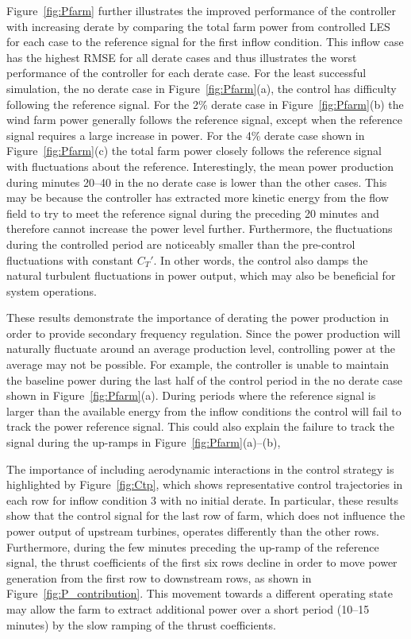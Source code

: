 Figure~\ref{fig:Pfarm} further illustrates the improved performance of the controller with increasing derate by comparing the total farm power from controlled LES for each case to the reference signal for the first inflow condition. This inflow case has the highest RMSE for all derate cases and thus illustrates the worst performance of the controller for each derate case. For the least successful simulation, the no derate case in Figure~\ref{fig:Pfarm}(a), the control has difficulty following the reference signal. For the 2\% derate case in Figure~\ref{fig:Pfarm}(b) the wind farm power generally follows the reference signal, except when the reference signal requires a large increase in power. For the 4\% derate case shown in Figure~\ref{fig:Pfarm}(c) the total farm power closely follows the reference signal with fluctuations about the reference. Interestingly, the mean power production during minutes 20--40 in the no derate case is lower than the other cases. This may be because the controller has extracted more kinetic energy from the flow field to try to meet the reference signal during the preceding 20 minutes and therefore cannot increase the power level further. Furthermore, the fluctuations during the controlled period are noticeably smaller than the pre-control fluctuations with constant $C_T'$. In other words, the control also damps the natural turbulent fluctuations in power output, which may also be beneficial for system operations.


These results demonstrate the importance of derating the power production in order to provide secondary frequency regulation. Since the power production will naturally fluctuate around an average production level, controlling power at the average may not be possible. For example, the controller is unable to maintain the baseline power during the last half of the control period in the no derate case shown in Figure~\ref{fig:Pfarm}(a). During periods where the reference signal is larger than the available energy from the inflow conditions the control will fail to track the power reference signal. This could also explain the failure to track the signal during the up-ramps in Figure~\ref{fig:Pfarm}(a)--(b), 

The importance of including aerodynamic interactions in the control strategy is highlighted by Figure~\ref{fig:Ctp}, which shows representative control trajectories in each row for inflow condition 3 with no initial derate. In particular, these results show that the control signal for the last row of farm, which does not influence the power output of upstream turbines, operates differently than the other rows. Furthermore, during the few minutes preceding the up-ramp of the reference signal, the thrust coefficients of the first six rows decline in order to move power generation from the first row to downstream rows, as shown in Figure~\ref{fig:P_contribution}. This movement towards a different operating state may allow the farm to extract additional power over a short period (10--15 minutes) by the slow ramping of the thrust coefficients. 


